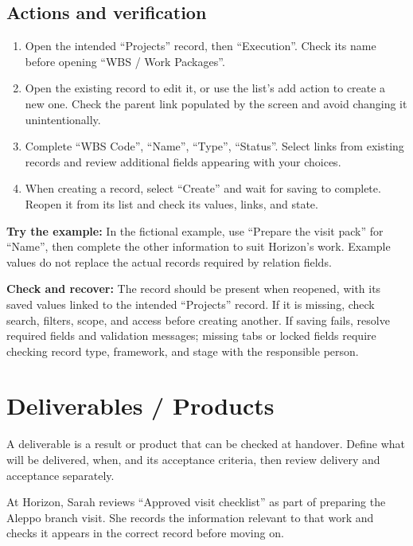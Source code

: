 \subsection{Actions and verification}
\begin{enumerate}
\item Open the intended “Projects” record, then “Execution”. Check its name before opening “WBS / Work Packages”.
\item Open the existing record to edit it, or use the list's add action to create a new one. Check the parent link populated by the screen and avoid changing it unintentionally.
\item Complete “WBS Code”, “Name”, “Type”, “Status”. Select links from existing records and review additional fields appearing with your choices.
\item When creating a record, select “Create” and wait for saving to complete. Reopen it from its list and check its values, links, and state.
\end{enumerate}

\textbf{Try the example:} In the fictional example, use “Prepare the visit pack” for “Name”, then complete the other information to suit Horizon's work. Example values do not replace the actual records required by relation fields.

\textbf{Check and recover:} The record should be present when reopened, with its saved values linked to the intended “Projects” record. If it is missing, check search, filters, scope, and access before creating another. If saving fails, resolve required fields and validation messages; missing tabs or locked fields require checking record type, framework, and stage with the responsible person.

\clearpage
\section{Deliverables / Products}
\label{sec:projects-feature-deliverables}

A deliverable is a result or product that can be checked at handover. Define what will be delivered, when, and its acceptance criteria, then review delivery and acceptance separately.

\begin{rcnote}
At Horizon, Sarah reviews “Approved visit checklist” as part of preparing the Aleppo branch visit. She records the information relevant to that work and checks it appears in the correct record before moving on.
\end{rcnote}

